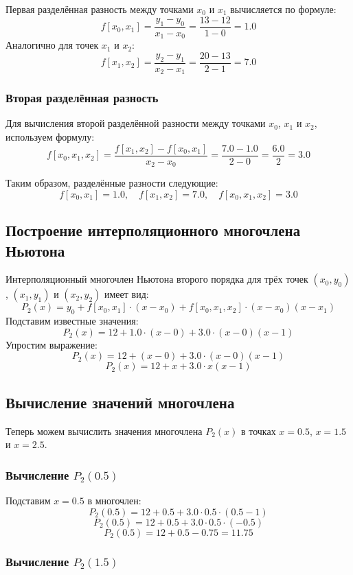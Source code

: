 \documentclass[a4paper,12pt]{article}
\begin{document}
Первая разделённая разность между точками $x_0$ и $x_1$ вычисляется по формуле:
\[
f[x_0, x_1] = \frac{y_1 - y_0}{x_1 - x_0} = \frac{13 - 12}{1 - 0} = 1.0
\]
Аналогично для точек $x_1$ и $x_2$:
\[
f[x_1, x_2] = \frac{y_2 - y_1}{x_2 - x_1} = \frac{20 - 13}{2 - 1} = 7.0
\]

\subsubsection*{Вторая разделённая разность}

Для вычисления второй разделённой разности между точками $x_0$, $x_1$ и $x_2$, используем формулу:
\[
f[x_0, x_1, x_2] = \frac{f[x_1, x_2] - f[x_0, x_1]}{x_2 - x_0} = \frac{7.0 - 1.0}{2 - 0} = \frac{6.0}{2} = 3.0
\]

Таким образом, разделённые разности следующие:
\[
f[x_0, x_1] = 1.0, \quad f[x_1, x_2] = 7.0, \quad f[x_0, x_1, x_2] = 3.0
\]

\subsection*{Построение интерполяционного многочлена Ньютона}

Интерполяционный многочлен Ньютона второго порядка для трёх точек $(x_0, y_0)$, $(x_1, y_1)$ и $(x_2, y_2)$ имеет вид:
\[
P_2(x) = y_0 + f[x_0, x_1] \cdot (x - x_0) + f[x_0, x_1, x_2] \cdot (x - x_0)(x - x_1)
\]
Подставим известные значения:
\[
P_2(x) = 12 + 1.0 \cdot (x - 0) + 3.0 \cdot (x - 0)(x - 1)
\]
Упростим выражение:
\[
P_2(x) = 12 + (x - 0) + 3.0 \cdot (x - 0)(x - 1)
\]
\[
P_2(x) = 12 + x + 3.0 \cdot x(x - 1)
\]

\subsection*{Вычисление значений многочлена}

Теперь можем вычислить значения многочлена $P_2(x)$ в точках $x = 0.5$, $x = 1.5$ и $x = 2.5$.

\subsubsection*{Вычисление $P_2(0.5)$}

Подставим $x = 0.5$ в многочлен:
\[
P_2(0.5) = 12 + 0.5 + 3.0 \cdot 0.5 \cdot (0.5 - 1)
\]
\[
P_2(0.5) = 12 + 0.5 + 3.0 \cdot 0.5 \cdot (-0.5)
\]
\[
P_2(0.5) = 12 + 0.5 - 0.75 = 11.75
\]

\subsubsection*{Вычисление $P_2(1.5)$}
\end{document}
